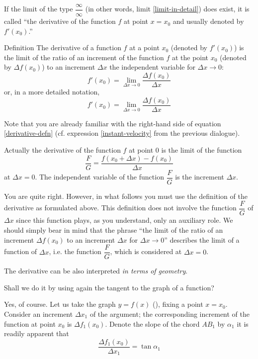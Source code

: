 If the limit of the type  $ \dfrac{\infty}{\infty}$ (in other words, limit \eqref{limit-in-detail}) does exist, it is called ``the derivative of the function $f$ at point $x = x_{0}$ and usually denoted by $f'(x_{0})$.''

\begin{mytheo}{Definition}
The derivative of a function $f$ at a point $x_{0}$ (denoted by $f'(x_{0})$) is the limit of the ratio of an increment of the function $f$ at the point $x_{0}$ (denoted by  $\Delta f(x_{0})$) to an increment $\Delta x$ the independent variable for $\Delta x \to 0$:
\begin{equation*}%
f'(x_{0}) = \lim\limits_{\Delta x \to 0} \frac{\Delta f(x_{0})}{\Delta x}
\end{equation*}
or, in a more detailed notation,
\begin{equation}%
f'(x_{0}) = \lim\limits_{\Delta x \to 0} \frac{\Delta f(x_{0})}{\Delta x}
\label{derivative-defn}
\end{equation}
\end{mytheo}
Note that you are already familiar with the right-hand side of equation \eqref{derivative-defn} (cf. expression \eqref{instant-velocity} from the previous dialogue).

\rdr Actually the derivative of the function $f$ at point 0 is the limit of the function 
\begin{equation*}%
\frac{F}{G} =	\frac{ f (x_{0} + \Delta x) - f (x_{0})}{\Delta x}
\end{equation*}
at $ \Delta x = 0$. The independent variable of the function $\dfrac{F}{G}$
is the increment $\Delta x$. 

\athr You are quite right. However, in what follows you must use the definition of the derivative as formulated above. This definition does not involve the function $\dfrac{F}{G}$ of $\Delta x$ since this function plays, as you understand, only an auxiliary role. We should simply bear in mind that the phrase ``the limit of the ratio of an increment $\Delta f (x_{0})$ to an increment $\Delta x$ for $\Delta x \to 0$'' describes the limit of a function of $\Delta x$, i.e. the function $\dfrac{F}{G}$, which is considered at $\Delta x = 0$.

The derivative can be also interpreted \emph{in terms of geometry}.

\rdr Shall we do it by using again the tangent to the graph of a function?

\athr Yes, of course. Let us take the graph $y = f (x)$ (), fixing a point $x = x_{0}$. Consider an increment $\Delta x_{1}$  of the argument; the corresponding increment of the function at point $ x_{0}$ is $\Delta f_{1} (x_{0})$. Denote the slope of the chord $AB_{1}$ by $\alpha_{1}$ it is readily apparent that 
\begin{equation*}%
\frac{\Delta f_{1}(x_{0})}{\Delta x_{1}}  = \tan \alpha_{1}
\end{equation*}


